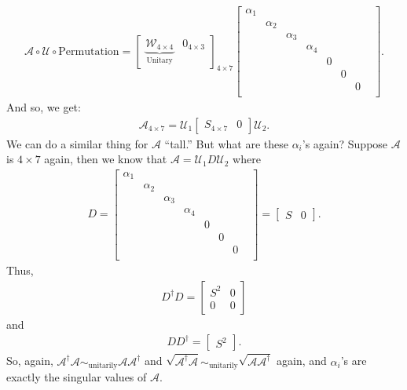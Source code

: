 \documentclass{book}
\theoremstyle{definition}
\newcommand{\Uni}{\mathcal{U}}
\newcommand{\A}{\mathcal{A}}
\begin{document}
\begin{align*}
\A \circ \Uni \circ \text{Permutation}= \begin{bmatrix}
\underbrace{\mathcal{W}_{4 \times 4}}_{\text{Unitary}} & 0_{4 \times 3}
\end{bmatrix}_{4\times 7}
\begin{bmatrix}
\alpha_1 &&&&&&\\
& \alpha_2 &&&&&\\
&& \alpha_3 &&&&\\
&&& \alpha_4 &&&&\\
&&&& 0&&\\
&&&&& 0&\\
&&&&& &0\\
\end{bmatrix}.
\end{align*}
And so, we get:
\begin{align*}
\A_{4 \times 7} = \Uni_1 \begin{bmatrix}
S_{4\times 7} & 0
\end{bmatrix} \Uni_2.
\end{align*}
We can do a similar thing for $\A$ ``tall.'' But what are these $\alpha_i$'s again? Suppose $\A$ is $4\times7$ again, then we know that $\A = \Uni_1 D \Uni_2$ where
\begin{align*}
D = \begin{bmatrix}
\alpha_1 &&&&&&\\
& \alpha_2 &&&&&\\
&& \alpha_3 &&&&\\
&&& \alpha_4 &&&&\\
&&&& 0&&\\
&&&&& 0&\\
&&&&& &0\\
\end{bmatrix} = \begin{bmatrix}
S & 0
\end{bmatrix}.
\end{align*}
Thus,
\begin{align*}
D^\dagger D = \begin{bmatrix}
S^2 & 0\\
0 & 0
\end{bmatrix}
\end{align*}
and 
\begin{align*}
DD^\dagger= \begin{bmatrix}
S^2
\end{bmatrix}.
\end{align*}
So, again, $\A^\dagger \A \sim_\text{unitarily} \A\A^\dagger$ and $\sqrt{\A^\dagger \A} \sim_\text{unitarily} \sqrt{\A\A^\dagger}$ again, and $\alpha_i$'s are exactly the singular values of $\A$. \\
\end{document}
